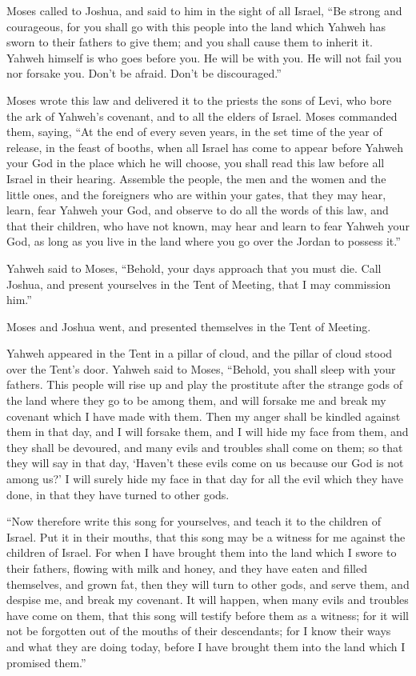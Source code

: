 Moses called to Joshua, and said to him in the sight of all
Israel, ``Be strong and courageous, for you shall go with this people
into the land which Yahweh has sworn to their fathers to give them; and
you shall cause them to inherit it.  Yahweh himself is who
goes before you. He will be with you. He will not fail you nor forsake
you. Don't be afraid. Don't be discouraged.''

 Moses wrote this law and delivered it to the priests the
sons of Levi, who bore the ark of Yahweh's covenant, and to all the
elders of Israel.  Moses commanded them, saying, ``At the
end of every seven years, in the set time of the year of release, in the
feast of booths,  when all Israel has come to appear before
Yahweh your God in the place which he will choose, you shall read this
law before all Israel in their hearing.  Assemble the
people, the men and the women and the little ones, and the foreigners
who are within your gates, that they may hear, learn, fear Yahweh your
God, and observe to do all the words of this law,  and that
their children, who have not known, may hear and learn to fear Yahweh
your God, as long as you live in the land where you go over the Jordan
to possess it.''

 Yahweh said to Moses, ``Behold, your days approach that
you must die. Call Joshua, and present yourselves in the Tent of
Meeting, that I may commission him.''

Moses and Joshua went, and presented themselves in the Tent of Meeting.

 Yahweh appeared in the Tent in a pillar of cloud, and the
pillar of cloud stood over the Tent's door.  Yahweh said to
Moses, ``Behold, you shall sleep with your fathers. This people will
rise up and play the prostitute after the strange gods of the land where
they go to be among them, and will forsake me and break my covenant
which I have made with them.  Then my anger shall be
kindled against them in that day, and I will forsake them, and I will
hide my face from them, and they shall be devoured, and many evils and
troubles shall come on them; so that they will say in that day, `Haven't
these evils come on us because our God is not among us?'  I
will surely hide my face in that day for all the evil which they have
done, in that they have turned to other gods.

 ``Now therefore write this song for yourselves, and teach
it to the children of Israel. Put it in their mouths, that this song may
be a witness for me against the children of Israel.  For
when I have brought them into the land which I swore to their fathers,
flowing with milk and honey, and they have eaten and filled themselves,
and grown fat, then they will turn to other gods, and serve them, and
despise me, and break my covenant.  It will happen, when
many evils and troubles have come on them, that this song will testify
before them as a witness; for it will not be forgotten out of the mouths
of their descendants; for I know their ways and what they are doing
today, before I have brought them into the land which I promised them.''

